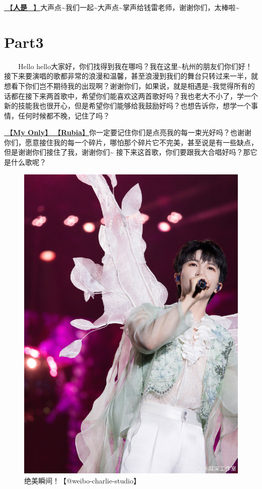 \documentclass[]{ctexbook}
\begin{document}
\hyperref[renshi]{🎵【\textbf{人是\_}】}大声点\textasciitilde 我们一起\textasciitilde 大声点\textasciitilde 掌声给钱雷老师，谢谢你们，太棒啦\textasciitilde{}

\section{Part3}\label{hangzhou-20240823-part3}

  Hello hello大家好，你们找得到我在哪吗？我在这里\textasciitilde 杭州的朋友们你们好！接下来要演唱的歌都非常的浪漫和温馨，甚至浪漫到我们的舞台只转过来一半，就想看下你们岂不期待我的出现啊？谢谢你们，如果说，就是相遇是\textasciitilde 我觉得所有的话都在接下来两首歌中，希望你们能喜欢这两首歌好吗？我也老大不小了，学一个新的技能我也很开心，但是希望你们能够给我鼓励好吗？也想告诉你，想学一个事情，任何时候都不晚，记住了吗？

\hyperref[my-only]{🎵【\textbf{My Only}】}\hyperref[rubia]{🎵【\textbf{Rubia}】}你一定要记住你们是点亮我的每一束光好吗？也谢谢你们，愿意接住我的每一个碎片，哪怕那个碎片它不完美，甚至说是有一些缺点，但是谢谢你们接住了我，谢谢你们\textasciitilde{}
接下来这首歌，你们要跟我大合唱好吗？那它是什么歌呢？

\begin{figure}

{\centering \includegraphics[width=450pt]{img/hangzhou20240823/001} 

}

\caption{绝美瞬间！【@weibo-charlie-studio】}\label{fig:unnamed-chunk-83}
\end{figure}
\end{document}

